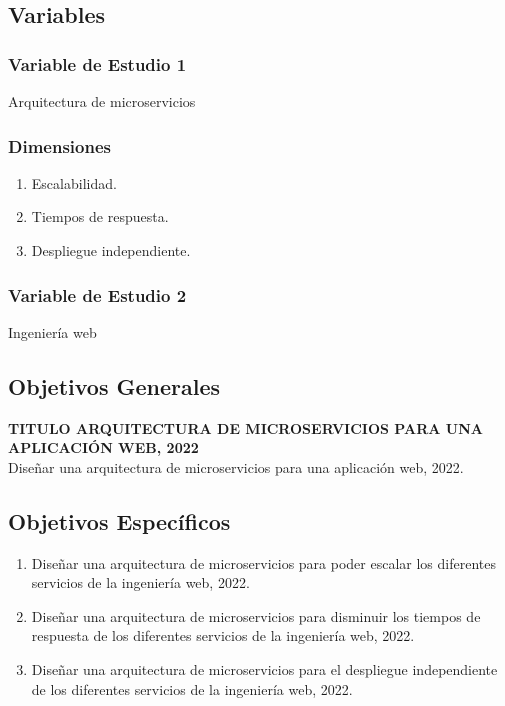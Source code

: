 
\subsection{Variables}

\subsubsection{Variable de Estudio 1}
Arquitectura de microservicios

\subsubsection{Dimensiones}
\begin{enumerate}
  \item Escalabilidad.
  \item Tiempos de respuesta.
  \item Despliegue independiente.
\end{enumerate}


\subsubsection{Variable de Estudio 2}
Ingeniería web


\subsection{Objetivos Generales}

{\fontsize{14pt}{ \baselineskip}\selectfont \textbf{
  TITULO ARQUITECTURA DE MICROSERVICIOS PARA UNA APLICACIÓN WEB, 2022
}}\\[0.5cm]
Diseñar una arquitectura de microservicios para una aplicación web, 2022.


\subsection{Objetivos Específicos}

\begin{enumerate}
  \item Diseñar una arquitectura de microservicios para poder escalar los diferentes servicios de la ingeniería web, 2022.
  \item Diseñar una arquitectura de microservicios para disminuir los tiempos de respuesta de los diferentes servicios de la ingeniería web, 2022.
  \item Diseñar una arquitectura de microservicios para el despliegue independiente de los diferentes servicios de la ingeniería web, 2022.
\end{enumerate}
